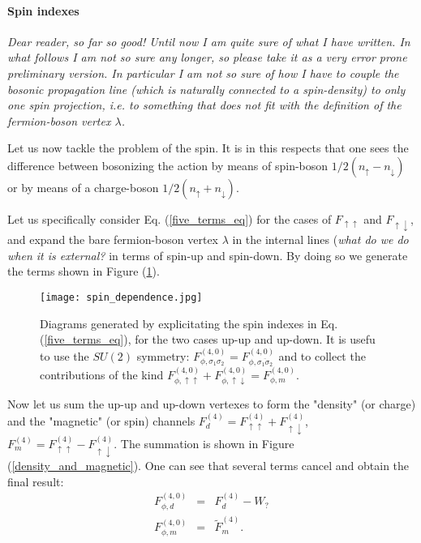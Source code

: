 \documentclass[a4paper,11pt]{article}
\begin{document}
\paragraph{Spin indexes}  
\emph{Dear reader, so far so good! Until now I am quite sure of what I have written. In what follows I am not so sure any longer, so please take it as a very error prone preliminary version. In particular I am not so sure of how I have to couple the bosonic propagation line (which is naturally connected to a spin-density) to only one spin projection, i.e. to something that does not fit with the definition of the fermion-boson vertex $\lambda$.}

Let us now tackle the problem of the spin. It is in this respects that one sees the difference between bosonizing the action by means of spin-boson $1/2 (n_\uparrow-n_\downarrow)$ or by means of a charge-boson $1/2 (n_\uparrow + n_\downarrow)$.

Let us specifically consider Eq. (\ref{five_terms_eq}) for the cases of $F_{\uparrow\uparrow}$ and $F_{\uparrow\downarrow}$, and expand the bare fermion-boson vertex $\lambda$ in the internal lines (\emph{what do we do when it is external?} in terms of spin-up and spin-down. By doing so we generate the terms shown in Figure (\ref{spindependence}). 
\begin{figure}
\texttt{[image: spin\_dependence.jpg]}
\caption{Diagrams generated by explicitating the spin indexes in Eq. (\ref{five_terms_eq}), for the two cases up-up and up-down. 
It is usefu to use the $SU(2)$ symmetry: $F_{\phi,\sigma_1\sigma_2}^{(4,0)} = F_{\phi,\overline{\sigma_1\sigma_2}}^{(4,0)}   $ and to collect the contributions of the kind $F_{\phi,\uparrow\uparrow}^{(4,0)} +F_{\phi,\uparrow\downarrow}^{(4,0)}=F_{\phi,m}^{(4,0)}$.} \label{spindependence} 

\end{figure}  

Now let us sum the up-up and up-down vertexes to form the "density" (or charge) and the "magnetic" (or spin) channels\cite{Rohringer2012} $F_d^{(4)} = F_{\uparrow\uparrow}^{(4)}+F_{\uparrow\downarrow}^{(4)}$, $F_m^{(4)} = F_{\uparrow\uparrow}^{(4)}-F_{\uparrow\downarrow}^{(4)}$. 
The summation is shown in Figure (\ref{density_and_magnetic}). One can see that several terms cancel and obtain the final result: 
\begin{eqnarray}
F_{\phi,d}^{(4,0)}  & = & F_d^{(4)} - W_{?} \label{doubt} \\ 
F_{\phi,m}^{(4,0)} & = & \tilde F_m^{(4)}.    
\end{eqnarray}  
\end{document}
